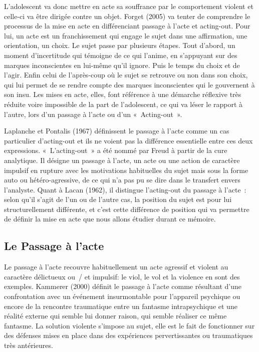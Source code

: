 \documentclass[12pt, a4paper]{book}
\begin{document}
\begin{spacing}{1.5}
L'adolescent va donc mettre en acte sa souffrance par le comportement violent et celle-ci va être dirigée contre un objet. Forget (2005) va tenter de comprendre le processus de la mise en acte en différenciant passage à l'acte et acting-out. Pour lui, un acte est un franchissement qui engage le sujet dans une affirmation, une orientation, un choix. Le sujet passe par plusieurs étapes. Tout d'abord, un moment d'incertitude qui témoigne de ce qui l'anime, en s'appuyant sur des marques inconscientes en lui-même qu'il ignore. Puis le temps du choix et de l'agir. Enfin celui de l'après-coup où le sujet se retrouve ou non dans son choix, qui lui permet de se rendre compte des marques inconscientes qui le gouvernent à son insu. Les mises en acte, elles, font référence à une démarche réflexive très réduite voire impossible de la part de l'adolescent, ce qui va léser le rapport à l'autre, lors d'un passage à l'acte ou d'un « Acting-out ».

Laplanche et Pontalis (1967) définissent le passage à l'acte comme un cas particulier d'acting-out et ils ne voient pas la différence essentielle entre ces deux expressions. « L'acting-out » a été nommé par Freud à partir de la cure analytique. Il désigne un passage à l'acte, un acte ou une action de caractère impulsif en rupture avec les motivations habituelles du sujet mais sous la forme auto ou hétéro-agressive, de ce qui n'a pas pu se dire dans le transfert envers l'analyste.  Quant à Lacan (1962), il distingue l'acting-out du passage à l'acte : selon qu'il s'agit de l'un ou de l'autre cas, la position du sujet est pour lui structurellement différente, et c'est cette différence de position qui va permettre de définir la mise en acte que nous allons étudier durant ce mémoire.

\subsection{Le Passage à l'acte}

Le passage à l'acte recouvre habituellement un acte agressif et violent au caractère délictueux ou / et impulsif: le viol, le vol et la violence en sont des exemples. Kammerer (2000) définit le passage à l'acte comme résultant d'une confrontation avec un événement insurmontable pour l'appareil psychique ou encore de la rencontre traumatique entre un fantasme intrapsychique et une réalité externe qui semble lui donner raison, qui semble réaliser ce même fantasme. La solution violente s'impose au sujet, elle est le fait de fonctionner sur des défenses mises en place dans des expériences pervertissantes ou traumatiques très antérieures. 


\end{spacing}
\end{document}
